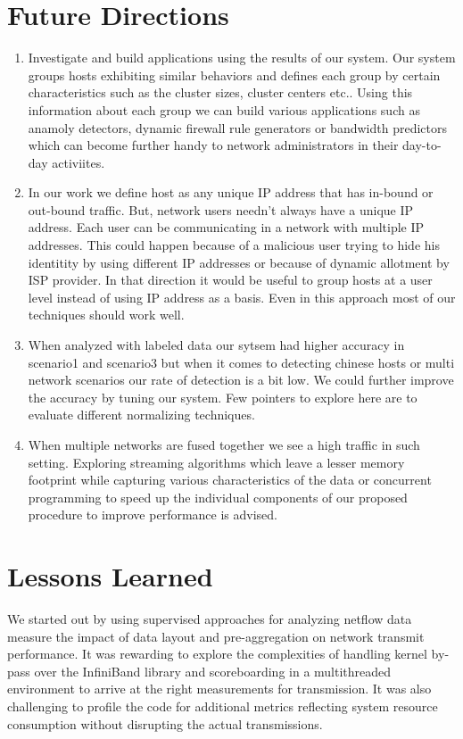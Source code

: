 \section{Future Directions}

\begin{enumerate}
	\item Investigate and build applications using the results of our system. Our system groups hosts exhibiting similar behaviors and defines each group by certain characteristics such as the cluster sizes, cluster centers etc.. Using this information about each group we can build various applications such as anamoly detectors, dynamic firewall rule generators or bandwidth predictors which can become further handy to network administrators in their day-to-day activiites.
	
	\item In our work we define host as any unique IP address that has in-bound or out-bound traffic. But, network users needn't always have a unique IP address. Each user can be communicating in a network with multiple IP addresses. This could happen because of a malicious user trying to hide his identitity by using different IP addresses or because of dynamic allotment by ISP provider. In that direction it would be useful to group hosts at a user level instead of using IP address as a basis. Even in this approach most of our techniques should work well. 
	
	\item When analyzed with labeled data our sytsem had higher accuracy in scenario1 and scenario3 but when it comes to detecting chinese hosts or multi network scenarios our rate of detection is a bit low. We could further improve the accuracy by tuning our system. Few pointers to explore here are to evaluate different normalizing techniques.
	
	\item When multiple networks are fused together we see a high  traffic in such setting. Exploring streaming algorithms \cite{} which leave a lesser memory footprint while capturing various characteristics of the data or  concurrent programming to speed up the individual components of our proposed procedure to improve performance is advised.
\end{enumerate}

\section{Lessons Learned}
We started out by using supervised approaches for analyzing netflow data  measure the impact of data layout and pre-aggregation on network transmit performance. 
It was rewarding to explore the complexities of handling kernel by-pass over the InfiniBand library and 
scoreboarding in a multithreaded environment to arrive at the right measurements for transmission.
It was also challenging to profile the code for additional metrics reflecting system resource consumption 
without disrupting the actual transmissions. 

